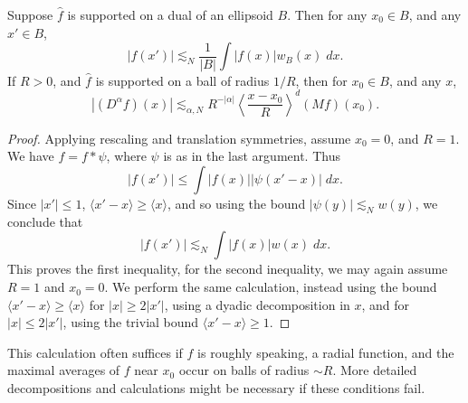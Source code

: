 \begin{lemma}
    Suppose $\widehat{f}$ is supported on a dual of an ellipsoid $B$. Then for any $x_0 \in B$, and any $x' \in B$,
    \[ |f(x')| \lesssim_N \frac{1}{|B|} \int |f(x)| w_B(x)\; dx. \]
    If $R > 0$, and $\widehat{f}$ is supported on a ball of radius $1/R$, then for $x_0 \in B$, and any $x$,
    \[ |(D^\alpha f)(x)| \lesssim_{\alpha,N} R^{-|\alpha|} \left\langle \frac{x - x_0}{R} \right\rangle^d (Mf)(x_0). \]
\end{lemma}
\begin{proof}
    Applying rescaling and translation symmetries, assume $x_0 = 0$, and $R = 1$. We have $f = f * \psi$, where $\psi$ is as in the last argument. Thus
    \[ |f(x')| \leq \int |f(x)| |\psi(x' - x)|\; dx. \]
    Since $|x'| \leq 1$, $\langle x' - x \rangle \geq \langle x \rangle$, and so using the bound $|\psi(y)| \lesssim_N w(y)$, we conclude that
    \[ |f(x')| \lesssim_N \int |f(x)| w(x)\; dx. \]
    This proves the first inequality, for the second inequality, we may again assume $R = 1$ and $x_0 = 0$. We perform the same calculation, instead using the bound $\langle x' - x \rangle \geq \langle x \rangle$ for $|x| \geq 2 |x'|$, using a dyadic decomposition in $x$, and for $|x| \leq 2 |x'|$, using the trivial bound $\langle x' - x \rangle \geq 1$.
\end{proof}

\begin{remark}
    This calculation often suffices if $f$ is roughly speaking, a radial function, and the maximal averages of $f$ near $x_0$ occur on balls of radius $\sim R$. More detailed decompositions and calculations might be necessary if these conditions fail.
\end{remark}

